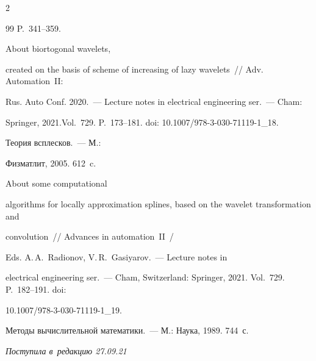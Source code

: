 \begin{multicols}{2}
{{\begin{thebibliography}{99}
P.~341--359.




 About biortogonal wavelets, 


created on the basis of scheme of increasing of lazy wavelets~// Adv.  Automation~II: 


Rus. Auto Conf. 2020.~--- Lecture notes in electrical engineering ser.~--- Cham: 


Springer, 2021.Vol.~729. P.~173--181. doi: 10.1007/978-3-030-71119-1\_18.




 Тео\-рия всплес\-ков.~--- М.: 


Физматлит, 2005. 612~c.




 About some computational 


algorithms for locally approximation splines, based on the wavelet transformation and 


convolution~// Advances in automation~II~/


Eds. A.\,A.~Radionov, V.\,R.~Gasiyarov.~--- Lecture notes in 


electrical engineering ser.~--- Cham, Switzerland: Springer, 2021. Vol.~729. P.~182--191. doi: 


10.1007/978-3-030-71119-1\_19.




 Методы вы\-чис\-ли\-тель\-ной математики.~--- М.: Наука, 1989. 744~с.





\end{thebibliography}





 }


 }





\end{multicols}





\vspace*{-6pt}





\hfill{\small\textit{Поступила в~редакцию 27.09.21}}





